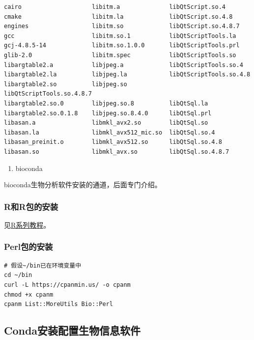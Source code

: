 \documentclass[]{article}
\providecommand{\tightlist}{%
  \setlength{\itemsep}{0pt}\setlength{\parskip}{0pt}}
\numberwithin{figure}{section}
\numberwithin{table}{section}
\begin{document}
\begin{verbatim}
cairo                    libitm.a              libQtScript.so.4
cmake                    libitm.la             libQtScript.so.4.8
engines                  libitm.so             libQtScript.so.4.8.7
gcc                      libitm.so.1           libQtScriptTools.la
gcj-4.8.5-14             libitm.so.1.0.0       libQtScriptTools.prl
glib-2.0                 libitm.spec           libQtScriptTools.so
libargtable2.a           libjpeg.a             libQtScriptTools.so.4
libargtable2.la          libjpeg.la            libQtScriptTools.so.4.8
libargtable2.so          libjpeg.so            libQtScriptTools.so.4.8.7
libargtable2.so.0        libjpeg.so.8          libQtSql.la
libargtable2.so.0.1.8    libjpeg.so.8.4.0      libQtSql.prl
libasan.a                libmkl_avx2.so        libQtSql.so
libasan.la               libmkl_avx512_mic.so  libQtSql.so.4
libasan_preinit.o        libmkl_avx512.so      libQtSql.so.4.8
libasan.so               libmkl_avx.so         libQtSql.so.4.8.7
\end{verbatim}

\begin{enumerate}
\def\labelenumi{\arabic{enumi}.}
\setcounter{enumi}{1}
\tightlist
\item
  bioconda
\end{enumerate}

bioconda生物分析软件安装的通道，后面专门介绍。

\hypertarget{R_install}{%
\subsubsection{R和R包的安装}\label{R_install}}

见\href{http://www.ehbio.com/Bioinfo_R_course}{R系列教程}。

\hypertarget{perl_package}{%
\subsubsection{Perl包的安装}\label{perl_package}}

\begin{verbatim}
# 假设~/bin已在环境变量中
cd ~/bin
curl -L https://cpanmin.us/ -o cpanm
chmod +x cpanm
cpanm List::MoreUtils Bio::Perl
\end{verbatim}

\hypertarget{condaInstall}{%
\subsection{Conda安装配置生物信息软件}\label{condaInstall}}
\end{document}
